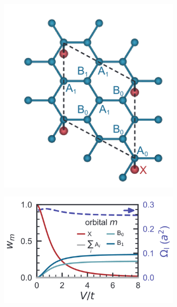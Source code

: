 \documentclass[../main.tex]{subfiles}
\begin{document}
\begin{figure}[t]
	\centering
	\begin{subfigure}[t]{0.4\textwidth}
		\centering
		\caption{\hfill\null}\label{sfig:extended decorated graphene lattice}
		\includegraphics[width=\textwidth]{images/extended decorated graphene lattice}
	\end{subfigure}%
	\begin{subfigure}[t]{0.6\textwidth}
		\centering
		\caption{\hfill\null}\label{sfig:extended decorated graphene orbital weight}
		\includegraphics[width=\textwidth]{images/extended decorated graphene orbital weight}

\end{subfigure}
\end{figure}
\end{document}
